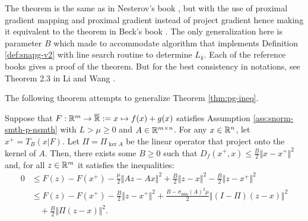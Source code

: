 \documentclass[12pt]{article}
\begin{document}
            \begin{remark}
                The theorem is the same as in Nesterov's book \cite[Theorem 2.2.13]{nesterov_lectures_2018}, but with the use of proximal gradient mapping and proximal gradient instead of project gradient hence making it equivalent to the theorem in Beck's book \cite[Theorem 10.16]{beck_first-order_2017}. 
                The only generalization here is parameter $B$ which made to accommodate algorithm that implements Definition \ref{def:snapg-v2} with line search routine to determine $L_k$. 
                Each of the reference books gives a proof of the theorem. 
                But for the best consistency in notations, see Theorem 2.3 in Li and Wang \cite{li_relaxed_2025}. 
            \end{remark}
            The following theorem attempts to generalize Theorem \ref{thm:pg-ineq}. 
            \begin{theorem}\label{thm:pg-ineq-semi-scnvx}
                Suppose that $F:\mathbb R^m \rightarrow \overline {\mathbb R} := x \mapsto f(x) + g(x)$ satisfies Assumption \ref{ass:snorm-smth-p-nsmth} with $L > \mu \ge 0$ and $A \in \mathbb R^{m\times n}$. 
                For any $x \in \mathbb R^n$, let $x^+ = T_B(x | F)$. 
                Let $\Pi = \Pi_{\ker A}$ be the linear operator that project onto the kernel of $A$. 
                Then, there exists some $B \ge 0$ such that $D_f(x^+, x) \le \frac{B}{2}\Vert x - x^+\Vert^2$ and, for all $z \in \mathbb R^m$ it satisfies the inequalities: 
                \begin{align*}
                    0 &\le F(z) - F(x^+) 
                    - \frac{\mu}{2}\Vert Az - Ax\Vert^2 
                    + \frac{B}{2}\Vert z - x\Vert^2
                    - \frac{B}{2}\Vert z - x^+\Vert^2
                    \\
                    &\le F(z) - F(x^+)
                    - \frac{B}{2}\Vert z - x^+\Vert^2 
                    + \frac{B - \sigma_{\min}(A)^2\mu}{2}\Vert (I - \Pi)(z - x) \Vert^2
                        \\ &\quad 
                        + \frac{B}{2}\Vert \Pi(z - x)\Vert^2. 
                \end{align*}
            \end{theorem}
\end{document}
